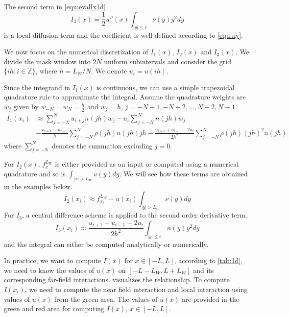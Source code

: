 \documentclass[3p,,preprint,12pt]{elsarticle}
\theoremstyle{definition}
\begin{document}
The second term in \cref{equ:evalIx1d} 
\begin{equation}
	I_3(x) = \frac{1}{2}u''(x)\int_{|y|\leq r}\nu(y)y^2 dy
\end{equation}
is a local diffusion term and the coefficient is well defined according to \cref{equ:ny}.

We now focus on the numerical discretization of $I_1(x)$, $I_2(x)$ and $I_3(x)$. We divide the mask window into $2N$ uniform subintervals and consider the grid $\{ih:i\in\mathbb{Z} \}$, where $h = L_W/N$. We denote $u_i = u(ih)$.

Since the integrand in $I_1(x)$ is continuous, we can use a simple trapezoidal quadrature rule to approximate the integral. Assume the quadrature weights are $w_j$ given by $w_{-N}=w_N = \frac{h}{2}$ and $w_j=h$, $j=-N+1, -N+2, \ldots, N-2, N-1$.
\begin{equation}\label{equ:I1approx}
  \begin{aligned}
	I_1(x_i) &\approx \sum\limits_{j =  - N}^N {{u_{i + j}}n(jh){w_j}}  - {u_i}\sum\limits_{j =  - N}^N {n(jh){w_j}} \\
	& - \frac{{{u_{i + 1}} - {u_{i - 1}}}}{h}\sum\limits_{j =  - N}^N {\rho (jh)n(jh)jh}  - \frac{{{u_{i + 1}} + {u_{i - 1}} - 2{u_i}}}{{2{h^2}}}\sum\limits_{j =  - N}^N {\rho (jh){{(jh)}^2}n(jh)} 
\end{aligned}
\end{equation}
where $\sum\limits_{j =  - N}^N$ denotes the summation excluding $j=0$. 

For $I_2(x)$, $f_x^{L_W}$ is either provided as an input or computed using a numerical quadrature and so is $\int_{|x|>L_W} \nu(y)dy$. We will see how these terms are obtained in the examples below. 
\begin{equation}\label{equ:I2approx}
	I_2(x_i)\approx f_{x_i}^{L_W} - u(x_i)\int_{|y|> L_W}\nu(y)dy
\end{equation}
For $I_3$, a central difference scheme is applied to the second order derivative term. 
\begin{equation}\label{equ:I3approx}
	I_3(x_i)\approx \frac{{{u_{i + 1}} + {u_{i - 1}} - 2{u_i}}}{{2{h^2}}}\int_{|y| \leqslant r} n (y){y^2}dy
\end{equation}
and the integral can either be computed analytically or numerically. 


In practice, we want to compute $I(x)$ for $x\in [-L,L]$, according to \cref{tab:1d}, we need to know the values of $u(x)$ on $[-L-L_W,L+L_W]$ and its corresponding far-field interactions.  visualizes the relationship. To compute $I(x_i)$, we need to compute the near field interaction and local interaction using values of $u(x)$ from the green area. The values of $u(x)$ are provided in the green and red area for computing $I(x)$, $x\in [-L, L]$.
\end{document}
